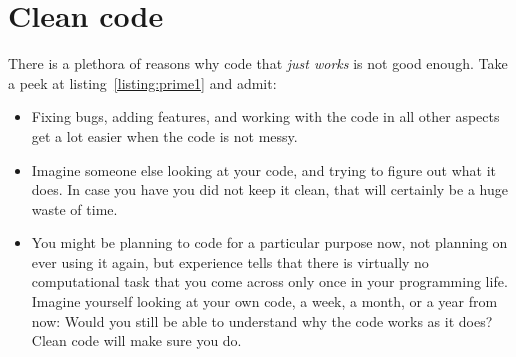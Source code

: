 %
%
%
%
%
\newpage
\section{Clean code}

There is a plethora of reasons why code that \emph{just works\texttrademark}
is not good enough. Take a peek at listing~\ref{listing:prime1} and admit:

\begin{itemize}
\item Fixing bugs, adding features, and working with the code in all other
  aspects get a lot easier when the code is not messy.
\item Imagine someone else looking at your code, and trying to figure out what
  it does. In case you have you did not keep it clean, that will certainly be a
  huge waste of time.
\item You might be planning to code for a particular purpose now, not planning
  on ever using it again, but experience tells that there is virtually no
  computational task that you come across only once in your programming life.
  Imagine yourself looking at your own code, a week, a month, or a year from
  now: Would you still be able to understand why the code works as it does?
  Clean code will make sure you do.
\end{itemize}

